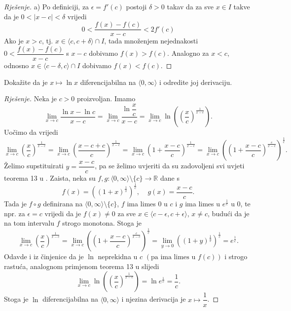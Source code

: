 \begin{proof}[Rješenje]
a) Po definiciji, za $\epsilon=f'(c)$ postoji $\delta>0$ takav da za sve $x\in I$ takve da je $0<|x-c|<\delta$ vrijedi
$$0<\dfrac{f(x)-f(c)}{x-c}<2f'(c)$$
Ako je $x>c$, tj. $x\in \langle c,c+\delta\rangle\cap I$, tada množenjem nejednakosti $0<\dfrac{f(x)-f(c)}{x-c}$ s $x-c$ dobivamo $f(x)>f(c)$. Analogno za $x<c$, odnosno $x\in \langle c-\delta, c\rangle\cap I$ dobivamo $f(x)<f(c)$.
\end{proof}

\begin{exercise}
Dokažite da je $x\mapsto \ln{x}$ diferencijabilna na $\langle 0,\infty\rangle$ i odredite joj derivaciju.
\end{exercise}
\begin{proof}[Rješenje]
Neka je $c>0$ proizvoljan. Imamo
$$\lim\limits_{x\to c}{\dfrac{\ln{x}-\ln{c}}{x-c}}=\lim\limits_{x\to c}{\dfrac{\ln{\dfrac{x}{c}}}{x-c}}=\lim\limits_{x\to c}{\ln\left(\left(\dfrac{x}{c}\right)^\frac{1}{x-c}\right)}.$$
Uočimo da vrijedi
$$\lim\limits_{x\to c}{\left(\dfrac{x}{c}\right)^\frac{1}{x-c}}=\lim\limits_{x\to c}{\left(\dfrac{x-c+c}{c}\right)^\frac{1}{x-c}}=\lim\limits_{x\to c}{\left(1+\dfrac{x-c}{c}\right)^\frac{1}{x-c}}=\lim\limits_{x\to c}{\left(\left(1+\dfrac{x-c}{c}\right)^\frac{c}{x-c}\right)^\frac{1}{c}}.$$
Želimo supstituirati $y=\dfrac{x-c}{c}$, pa se želimo uvjeriti da su zadovoljeni svi uvjeti teorema 13 u \cite{14}. Zaista, neka su $f, g : \langle 0, \infty\rangle\setminus\{c\}\to \mathbb{R}$ dane s 
$$f(x)=\left((1+x)^\frac{1}{x}\right)^\frac{1}{c},\;\;\;\;g(x)=\dfrac{x-c}{c}.$$ 
Tada je $f\circ g$ definirana na $\langle 0, \infty\rangle\setminus\{c\}$, $f$ ima limes $0$ u $c$ i $g$ ima limes u $e^\frac{1}{c}$ u $0$, te npr. za $\epsilon=c$ vrijedi da je $f(x)\neq 0$ za sve $x\in \langle c-\epsilon, c+\epsilon\rangle$, $x\neq c$, budući da je na tom intervalu $f$ strogo monotona. Stoga je
$$\lim\limits_{x\to c}{\left(\dfrac{x}{c}\right)^\frac{1}{x-c}}=\lim\limits_{x\to c}{\left(\left(1+\dfrac{x-c}{c}\right)^\frac{c}{x-c}\right)^\frac{1}{c}}=\lim\limits_{y\to 0}{\left((1+y)^\frac{1}{y}\right)^\frac{1}{c}}=e^\frac{1}{c}.$$
Odavde i iz činjenice da je $\ln$ neprekidna u $c$ $\left(\text{pa ima limes u }f(c)\right)$ i strogo rastuća, analognom primjenom teorema 13 u \cite{14} slijedi
$$\lim\limits_{x\to c}{\ln\left(\left(\dfrac{x}{c}\right)^\frac{1}{x-c}\right)}=\ln{e^\frac{1}{c}}=\dfrac{1}{c}.$$
Stoga je $\ln$ diferencijabilna na $\langle 0, \infty\rangle$ i njezina derivacija je $x\mapsto \dfrac{1}{x}$.
\end{proof}

